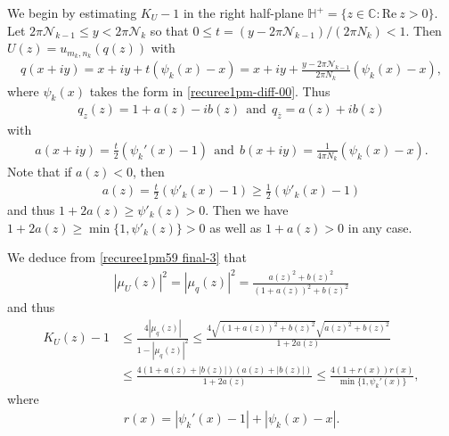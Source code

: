 \documentclass[12pt]{amsart}
\numberwithin{equation}{section}
\begin{document}
We begin by estimating $K_{U}-1$ in the right half-plane $\mathbb{H}^+=\{z\in\mathbb{C}: \text{Re}\ z>0\}$. Let $2\pi \mathcal{N}_{k-1}\leq y<2\pi\mathcal{N}_k$ so that $0\leq t=(y-2\pi\mathcal{N}_{k-1})/(2\pi N_k)<1$. Then $U(z)=u_{m_k,n_k}(q(z))$ with
\begin{equation}\label{recuree1pm59 final-3}
\begin{split}
q(x+iy)=x+iy+t(\psi_k(x)-x)=x+iy+\frac{y-2\pi\mathcal{N}_{k-1}}{2\pi N_k}(\psi_k(x)-x),
\end{split}
\end{equation}
where $\psi_k(x)$ takes the form in \eqref{recuree1pm-diff-00}. Thus
\begin{equation}\label{recuree1pm60 final-4}
\begin{split}
q_z(z)=1+a(z)-ib(z) \ \ \text{and} \ \ q_{\overline{z}}=a(z)+ib(z)
\end{split}
\end{equation}
with
\begin{equation}\label{recuree1pm61 final-5}
\begin{split}
a(x+iy)=\frac{t}{2}(\psi_k'(x)-1) \ \ \text{and} \ \ b(x+iy)=\frac{1}{4\pi N_k}(\psi_k(x)-x).
\end{split}
\end{equation}
Note that if $a(z)<0$, then
\begin{equation*}
\begin{split}
a(z)=\frac{t}{2}(\psi'_k(x)-1)\geq \frac{1}{2}(\psi'_k(x)-1)
\end{split}
\end{equation*}
and thus $1+2a(z)\geq \psi'_k(z)>0$. Then we have $1+2a(z)\geq \min\{1,\psi'_k(z)\}>0$ as well as $1+a(z)>0$ in any case.

We deduce from \eqref{recuree1pm59 final-3} that
\begin{equation*}%
\begin{split}
|\mu_U(z)|^2=|\mu_q(z)|^2=\frac{a(z)^2+b(z)^2}{(1+a(z))^2+b(z)^2}
\end{split}
\end{equation*}
and thus
\begin{equation*}%
\begin{split}
K_U(z)-1 &\leq \frac{4|\mu_q(z)|}{1-|\mu_q(z)|^2}\leq \frac{4\sqrt{(1+a(z))^2+b(z)^2}\sqrt{a(z)^2+b(z)^2}}{1+2a(z)}\\
&\leq \frac{4(1+a(z)+|b(z)|)(a(z)+|b(z)|)}{1+2a(z)}\leq \frac{4(1+r(x))r(x)}{\min\{1,\psi_k'(x)\}},
\end{split}
\end{equation*}
where
\begin{equation}\label{recuree1pm68 final-7}
\begin{split}
r(x)=|\psi_k'(x)-1|+|\psi_k(x)-x|.
\end{split}
\end{equation}
\end{document}
